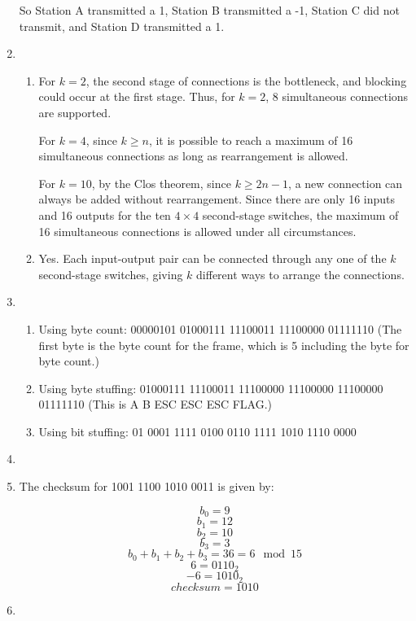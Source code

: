 \documentclass{article}
\begin{document}
\begin{enumerate}
So Station A transmitted a 1, Station B transmitted a -1, Station C did not transmit, and Station D transmitted a 1.

\item
\begin{enumerate}

\item For $k=2$, the second stage of connections is the bottleneck, and blocking could occur at the first stage. Thus, for $k=2$, 8 simultaneous connections are supported.

For $k=4$, since $k \geq n$, it is possible to reach a maximum of 16 simultaneous connections as long as rearrangement is allowed.

For $k=10$, by the Clos theorem, since $k \geq 2n-1$, a new connection can always be added without rearrangement. Since there are only 16 inputs and 16 outputs for the ten $4 \times 4$ second-stage switches, the maximum of 16 simultaneous connections is allowed under all circumstances.

\item Yes. Each input-output pair can be connected through any one of the $k$ second-stage switches, giving $k$ different ways to arrange the connections.

\end{enumerate}

\item
\begin{enumerate}

\item Using byte count:  00000101 01000111 11100011 11100000 01111110 (The first byte is the byte count for the frame, which is 5 including the byte for byte count.)

\item Using byte stuffing: 01000111 11100011 11100000 11100000 11100000 01111110
(This is A B ESC ESC ESC FLAG.) 

\item Using bit stuffing: 01 0001 1111 0100 0110 1111 1010 1110 0000

\end{enumerate}

\item 

\item The checksum for 1001 1100 1010 0011 is given by:

$$ b_0 = 9 $$
$$ b_1 = 12 $$
$$ b_2 = 10 $$
$$ b_3 = 3 $$
$$ b_0 + b_1 + b_2 + b_3 = 36 = 6 \mod 15 $$
$$ 6 = 0110_2 $$
$$ -6 = 1010_2 $$
$$ checksum = 1010 $$

\item

\end{enumerate}
\end{document}
